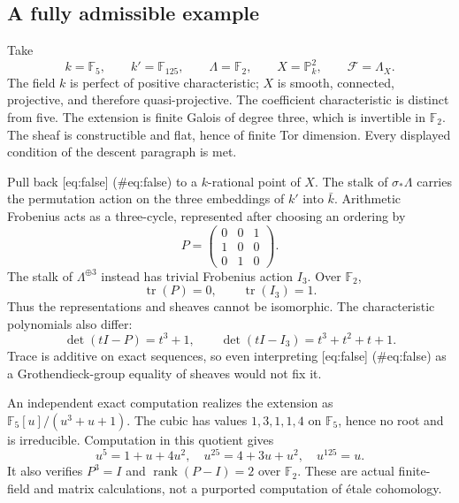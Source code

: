 \documentclass[10pt]{article}
\begin{document}
\subsection*{A fully admissible example}
Take \[k=\mathbb F_5,\qquad k'=\mathbb F_{125},\qquad
 \Lambda=\mathbb F_2,\qquad X=\mathbb P^2_k,\qquad \mathcal F=\Lambda_X.\] The field \(k\) is perfect of positive characteristic; \(X\) is smooth, connected, projective, and therefore quasi-projective. The coefficient characteristic is distinct from five. The extension is finite Galois of degree three, which is invertible in \(\mathbb F_2\). The sheaf is constructible and flat, hence of finite Tor dimension. Every displayed condition of the descent paragraph is met.\par
Pull back [eq:false] (\#eq:false) to a \(k\)-rational point of \(X\). The stalk of \(\sigma_*\Lambda\) carries the permutation action on the three embeddings of \(k'\) into \(\bar k\). Arithmetic Frobenius acts as a three-cycle, represented after choosing an ordering by \[P=\begin{pmatrix}0&0&1\\1&0&0\\0&1&0\end{pmatrix}.\] The stalk of \(\Lambda^{\oplus3}\) instead has trivial Frobenius action \(I_3\). Over \(\mathbb F_2\), \[\operatorname{tr}(P)=0,\qquad \operatorname{tr}(I_3)=1.\] Thus the representations and sheaves cannot be isomorphic. The characteristic polynomials also differ: \[\det(tI-P)=t^3+1,\qquad
 \det(tI-I_3)=t^3+t^2+t+1.\] Trace is additive on exact sequences, so even interpreting [eq:false] (\#eq:false) as a Grothendieck-group equality of sheaves would not fix it.\par
An independent exact computation realizes the extension as \(\mathbb F_5[u]/(u^3+u+1)\). The cubic has values \(1,3,1,1,4\) on \(\mathbb F_5\), hence no root and is irreducible. Computation in this quotient gives \[u^5=1+u+4u^2,\quad
 u^{25}=4+3u+u^2,\quad u^{125}=u.\] It also verifies \(P^3=I\) and \(\operatorname{rank}(P-I)=2\) over \(\mathbb F_2\). These are actual finite-field and matrix calculations, not a purported computation of étale cohomology.\par
\end{document}
